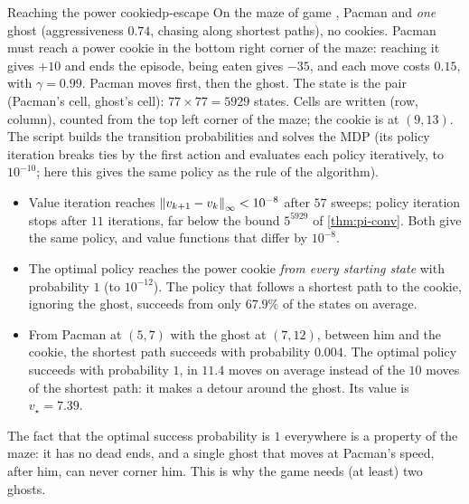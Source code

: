 \begin{pacman}{Reaching the power cookie}{dp-escape}
  On the maze  of game , Pacman and \emph{one}
  ghost (aggressiveness $0.74$, chasing along shortest paths), no cookies.
  Pacman must reach a power cookie in the bottom right corner of the maze:
  reaching it gives $+10$ and ends the episode, being eaten gives $-35$,
  and each move costs $0.15$, with $\gamma = 0.99$. Pacman moves first,
  then the ghost. The state is the pair (Pacman's cell, ghost's cell):
  $77 \times 77 = 5929$ states. Cells are written (row, column), counted
  from the top left corner of the maze; the cookie is at $(9, 13)$. The
  script  builds the transition
  probabilities and solves the MDP (its policy iteration breaks ties by
  the first action and evaluates each policy iteratively, to $10^{-10}$;
  here this gives the same policy as the rule of the algorithm).
  \begin{itemize}[nosep]
    \item Value iteration reaches $\left\lVert v_{k+1} - v_k \right\rVert_\infty < 10^{-8}$
      after $57$ sweeps; policy iteration stops after $11$ iterations, far
      below the bound $5^{5929}$ of \cref{thm:pi-conv}. Both give the same
      policy, and value functions that differ by $10^{-8}$.
    \item The optimal policy reaches the power cookie \emph{from every
      starting state} with probability $1$ (to $10^{-12}$). The policy that
      follows a shortest path to the cookie, ignoring the ghost, succeeds
      from only $67.9\%$ of the states on average.
    \item From Pacman at $(5, 7)$ with the ghost at $(7, 12)$, between him
      and the cookie, the shortest path succeeds with probability $0.004$.
      The optimal policy succeeds with probability $1$, in $11.4$ moves on
      average instead of the $10$ moves of the shortest path: it makes a
      detour around the ghost. Its value is $v_\star = 7.39$.
  \end{itemize}
  The fact that the optimal success probability is $1$ everywhere is a
  property of the maze: it has no dead ends, and a single ghost that moves
  at Pacman's speed, after him, can never corner him. This is why the game
  needs (at least) two ghosts.
\end{pacman}

